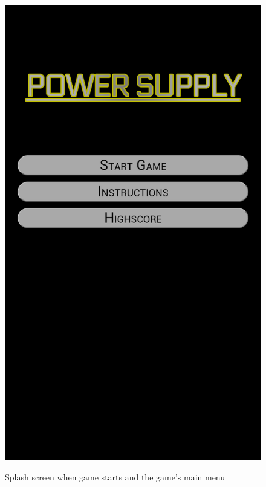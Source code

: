 \begin{figure}[H]
{		\includegraphics[scale=0.18]{pictures/sprint4-screen/mainmenu}
	}
	\caption{Splash screen when game starts and the game's main menu}
\end{figure}

